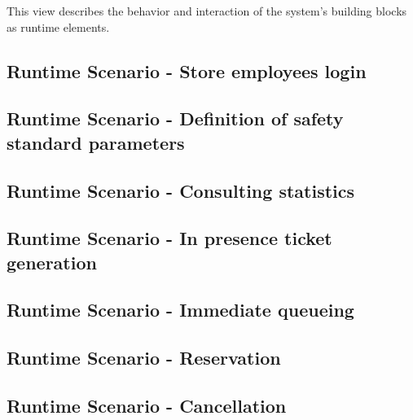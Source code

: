 \documentclass[../../main.tex]{subfiles}
\begin{document}
This view describes the behavior and interaction of the system’s building blocks as runtime elements.


\subsection{Runtime Scenario  - Store employees login}

\subsection{Runtime Scenario  - Definition of safety standard parameters}

\subsection{Runtime Scenario  - Consulting statistics}

\subsection{Runtime Scenario  - In presence ticket generation}

\subsection{Runtime Scenario  - Immediate queueing}

\subsection{Runtime Scenario  - Reservation}

\subsection{Runtime Scenario  - Cancellation}
\end{document}

